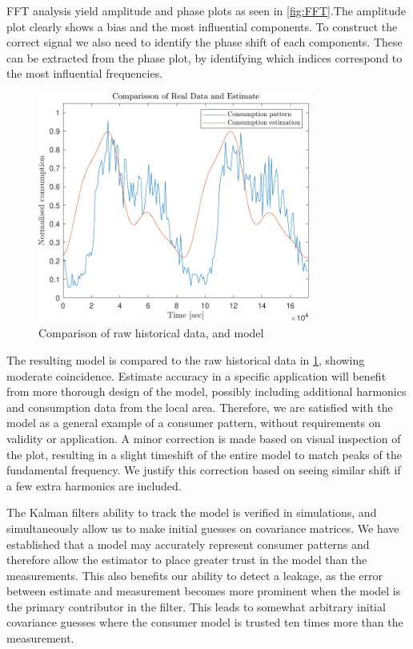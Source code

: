 FFT analysis yield amplitude and phase plots as seen in \cref{fig:FFT}.The amplitude plot clearly shows a bias and the most influential components. To construct the correct signal we also need to identify the phase shift of each components. These can be extracted from the phase plot, by identifying which indices correspond to the most influential frequencies.

\begin{figure}[h!]
	\centering
	\includegraphics[width=0.8\textwidth]{Pictures/Comparisson.pdf}
	
	\caption{Comparison of raw historical data, and model}
	\label{fig:Comparison}
\end{figure}

The resulting model is compared to the raw historical data in \cref{fig:Comparison}, showing moderate coincidence. Estimate accuracy in a specific application will benefit from more thorough design of the model, possibly including additional harmonics and consumption data from the local area. Therefore, we are satisfied with the model as a general example of a consumer pattern, without requirements on validity or application. A minor correction is made based on visual inspection of the plot, resulting in a slight timeshift of the entire model to match peaks of the fundamental frequency. We justify this correction based on seeing similar shift if a few extra harmonics are included.


The Kalman filters ability to track the model is verified in simulations, and simultaneously allow us to make initial guesses on covariance matrices. We have established that a model may accurately represent consumer patterns and therefore allow the estimator to place greater trust in the model than the measurements. This also benefits our ability to detect a leakage, as the error between estimate and measurement becomes more prominent when the model is the primary contributor in the filter. This leads to somewhat arbitrary initial covariance guesses where the consumer model is trusted ten times more than the measurement.

